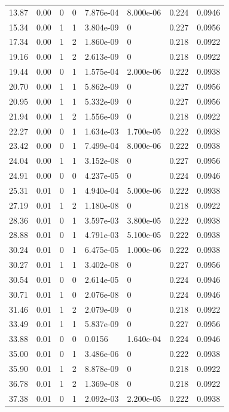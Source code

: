 \documentclass[preview]{standalone}
\begin{document}
{{\begin{tabular}{L{1.2cm}C{1.2cm} C{0.3cm}C{0.5cm} C{1.4cm}C{1.4cm} C{1.4cm}C{1.4cm}}
  13.87  &  0.00  & 0     &  0 &  7.876e-04  & 8.000e-06  & 0.224 &  0.0946   \\ 
  15.34  &  0.00  & 1     &  1 &  3.804e-09  & 0  & 0.227 &  0.0956   \\ 
  17.34  &  0.00  & 1     &  2 &  1.860e-09  & 0  & 0.218 &  0.0922   \\ 
  19.16  &  0.00  & 1     &  2 &  2.613e-09  & 0  & 0.218 &  0.0922   \\ 
  19.44  &  0.00  & 0     &  1 &  1.575e-04  & 2.000e-06  & 0.222 &  0.0938   \\ 
  20.70  &  0.00  & 1     &  1 &  5.862e-09  & 0  & 0.227 &  0.0956   \\ 
  20.95  &  0.00  & 1     &  1 &  5.332e-09  & 0  & 0.227 &  0.0956   \\ 
  21.94  &  0.00  & 1     &  2 &  1.556e-09  & 0  & 0.218 &  0.0922   \\ 
  22.27  &  0.00  & 0     &  1 &  1.634e-03  & 1.700e-05  & 0.222 &  0.0938   \\ 
  23.42  &  0.00  & 0     &  1 &  7.499e-04  & 8.000e-06  & 0.222 &  0.0938   \\ 
  24.04  &  0.00  & 1     &  1 &  3.152e-08  & 0  & 0.227 &  0.0956   \\ 
  24.91  &  0.00  & 0     &  0 &  4.237e-05  & 0  & 0.224 &  0.0946   \\ 
  25.31  &  0.01  & 0     &  1 &  4.940e-04  & 5.000e-06  & 0.222 &  0.0938   \\ 
  27.19  &  0.01  & 1     &  2 &  1.180e-08  & 0  & 0.218 &  0.0922   \\ 
  28.36  &  0.01  & 0     &  1 &  3.597e-03  & 3.800e-05  & 0.222 &  0.0938   \\ 
  28.88  &  0.01  & 0     &  1 &  4.791e-03  & 5.100e-05  & 0.222 &  0.0938   \\ 
  30.24  &  0.01  & 0     &  1 &  6.475e-05  & 1.000e-06  & 0.222 &  0.0938   \\ 
  30.27  &  0.01  & 1     &  1 &  3.402e-08  & 0  & 0.227 &  0.0956   \\ 
  30.54  &  0.01  & 0     &  0 &  2.614e-05  & 0  & 0.224 &  0.0946   \\ 
  30.71  &  0.01  & 1     &  0 &  2.076e-08  & 0  & 0.224 &  0.0946   \\ 
  31.46  &  0.01  & 1     &  2 &  2.079e-09  & 0  & 0.218 &  0.0922   \\ 
  33.49  &  0.01  & 1     &  1 &  5.837e-09  & 0  & 0.227 &  0.0956   \\ 
  33.88  &  0.01  & 0     &  0 &  0.0156  & 1.640e-04  & 0.224 &  0.0946   \\ 
  35.00  &  0.01  & 0     &  1 &  3.486e-06  & 0  & 0.222 &  0.0938   \\ 
  35.90  &  0.01  & 1     &  2 &  8.878e-09  & 0  & 0.218 &  0.0922   \\ 
  36.78  &  0.01  & 1     &  2 &  1.369e-08  & 0  & 0.218 &  0.0922   \\ 
  37.38  &  0.01  & 0     &  1 &  2.092e-03  & 2.200e-05  & 0.222 &  0.0938   \\ 
\hline 
\end{tabular} 

}}
\end{document}
